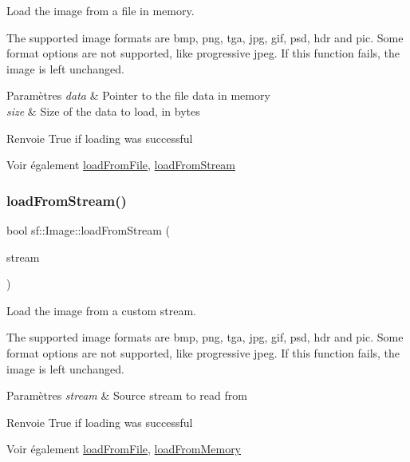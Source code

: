 Load the image from a file in memory. 

The supported image formats are bmp, png, tga, jpg, gif, psd, hdr and pic. Some format options are not supported, like progressive jpeg. If this function fails, the image is left unchanged.


\begin{DoxyParams}{Paramètres}
{\em data} & Pointer to the file data in memory \\
\hline
{\em size} & Size of the data to load, in bytes\\
\hline
\end{DoxyParams}
\begin{DoxyReturn}{Renvoie}
True if loading was successful
\end{DoxyReturn}
\begin{DoxySeeAlso}{Voir également}
\hyperlink{classsf_1_1Image_a9e4f2aa8e36d0cabde5ed5a4ef80290b}{load\+From\+File}, \hyperlink{classsf_1_1Image_a21122ded0e8368bb06ed3b9acfbfb501}{load\+From\+Stream} 
\end{DoxySeeAlso}
\mbox{\label{classsf_1_1Image_a21122ded0e8368bb06ed3b9acfbfb501}} 
\subsubsection{\texorpdfstring{load\+From\+Stream()}{loadFromStream()}}
{\footnotesize\ttfamily bool sf\+::\+Image\+::load\+From\+Stream (\begin{DoxyParamCaption}\item[{\hyperlink{classsf_1_1InputStream}{Input\+Stream} \&}]{stream }\end{DoxyParamCaption})}



Load the image from a custom stream. 

The supported image formats are bmp, png, tga, jpg, gif, psd, hdr and pic. Some format options are not supported, like progressive jpeg. If this function fails, the image is left unchanged.


\begin{DoxyParams}{Paramètres}
{\em stream} & Source stream to read from\\
\hline
\end{DoxyParams}
\begin{DoxyReturn}{Renvoie}
True if loading was successful
\end{DoxyReturn}
\begin{DoxySeeAlso}{Voir également}
\hyperlink{classsf_1_1Image_a9e4f2aa8e36d0cabde5ed5a4ef80290b}{load\+From\+File}, \hyperlink{classsf_1_1Image_aaa6c7afa5851a51cec6ab438faa7354c}{load\+From\+Memory} 
\end{DoxySeeAlso}
\mbox{\label{classsf_1_1Image_a51537fb667f47cbe80395cfd7f9e72a4}} 
